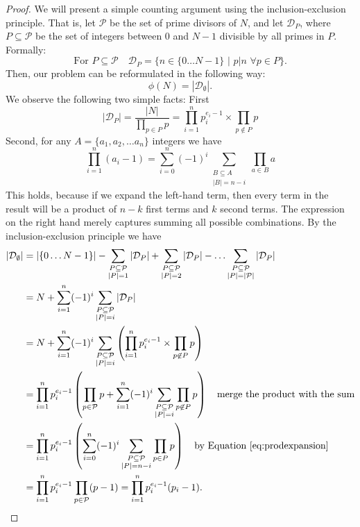 \documentclass{article}
\theoremstyle{definition}
\newcommand{\D}{\mathcal{D}}
\renewcommand{\P}{\mathcal{P}}
\begin{document}
\begin{proof}
  We will present a simple counting argument using the inclusion-exclusion
  principle. That is, let $\P$ be the set of prime divisors of $N$, and
  let $\D_P$, where $P \subseteq \P$ be the set of integers
  between $0$ and $N - 1$ divisible by all primes in $P$. Formally:
  \[
    \text{For } P \subseteq \P \quad \D_P = \{n \in \{0 \hdots
    N - 1\}\,\,|\,\,p | n\,\,\forall p \in P\}.
  \]
  Then, our problem can be reformulated in the following way:
  \[
    \phi(N) = |\D_\emptyset|.
  \]
  We observe the following two simple facts: First
  \[
    |\D_P| = \frac{|N|}{\prod_{p \in P}p} = \prod_{i = 1}^n p_i^{e_i -
      1} \times \prod_{p \not\in P}p
  \]
  Second, for any $A = \{a_1, a_2, \hdots a_n\}$ integers we have
  \begin{equation}
    \label{eq:prodexpansion}
    \prod_{i = 1}^n (a_i - 1) = \sum_{i = 0}^n (-1)^i
 \sum_{\substack{B \subseteq A \\ |B| = n - i}} \prod_{a \in B}a
  \end{equation}
  This holds, because if we expand the left-hand term, then every term in the
  result will be a product of $n - k$ first terms and $k$ second terms. The
  expression on the right hand merely captures summing all possible combinations.
  By the inclusion-exclusion principle we have
  \begin{align*}
    |\D_\emptyset| &= |\{0 \hdots N-1\}| - \sum_{\substack{P \subseteq \P \\ |P| =
        1}} |\D_P| + \sum_{\substack{P \subseteq \P \\ |P| =
        2}} |\D_P| - \hdots \sum_{\substack{P \subseteq \P \\ |P| =
    |\P|}} |\D_P| \\
                   &= N + \sum_{i = 1}^n (-1)^i \sum_{\substack{P \subseteq \P \\ |P| =
    i}} |\D_P| \\
                   &= N + \sum_{i = 1}^n (-1)^i \sum_{\substack{P \subseteq \P \\ |P| =
        i}} \left(  \prod_{i = 1}^n p_i^{e_i - 1} \times \prod_{p \not\in P}p \right)\\
                   &= \prod_{i = 1}^n p_i^{e_i - 1} \left( \prod_{p\in\P}p +  \sum_{i = 1}^n (-1)^i \sum_{\substack{P \subseteq \P \\ |P| =
    i}} \prod_{p \not\in P}p \right) \quad \text{merge the product with the sum}\\
                   &= \prod_{i = 1}^n p_i^{e_i - 1} \left( \sum_{i = 0}^n (-1)^i
 \sum_{\substack{P \subseteq \P \\ |P| = n - i}} \prod_{p \in P}p \right) \quad\text{by Equation \ref{eq:prodexpansion}}\\
                   &=\prod_{i = 1}^n p_i^{e_i - 1}\prod_{p \in \P} (p - 1) = \prod_{i = 1}^n p_i^{e_i - 1}(p_i - 1).
 \end{align*}
\end{proof}
\end{document}
